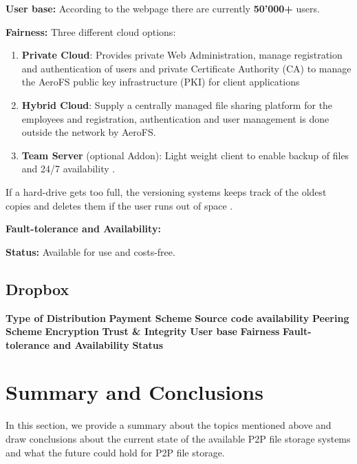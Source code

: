 \textbf{User base:} According to the webpage \cite{aerofs} there are currently \textbf{50'000+} users.

\textbf{Fairness:} Three different cloud options:
\begin{enumerate}
\item \textbf{Private Cloud}: Provides private Web Administration, manage registration and authentication of users and private Certificate Authority (CA) to manage the AeroFS public key infrastructure (PKI) for client applications
\item \textbf{Hybrid Cloud}: Supply a centrally managed file sharing platform for the employees and registration, authentication and user management is done outside the network by AeroFS.
\item \textbf{Team Server} (optional Addon): Light weight client to enable backup of files and 24/7 availability \cite{aerofs:cloud_types}.
\end{enumerate}
If a hard-drive gets too full, the versioning systems keeps track of the oldest copies and deletes them if the user runs out of space \cite{aerofs:USTO.RE}.

\textbf{Fault-tolerance and Availability:} 

\textbf{Status:} Available for use and costs-free.

\subsection{Dropbox} %

\textbf{Type of Distribution}
\textbf{Payment Scheme}
\textbf{Source code availability}
\textbf{Peering Scheme}
\textbf{Encryption}
\textbf{Trust \& Integrity}
\textbf{User base}
\textbf{Fairness}
\textbf{Fault-tolerance and Availability}
\textbf{Status}

\section{Summary and Conclusions} In this section, we provide a summary about the topics mentioned above and draw conclusions about the current state of the available P2P file storage systems and what the future could hold for P2P file storage.

